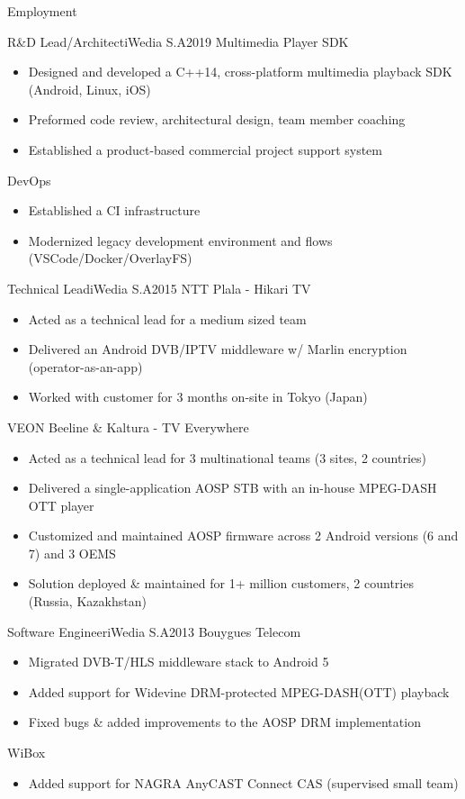 \documentclass[]{mcdowellcv}
\begin{document}
\begin{cvsection}{Employment}
		\begin{cvsubsection}{R\&D Lead/Architect}{iWedia S.A}{2019}
			Multimedia Player SDK
			\begin{itemize}
				\item Designed and developed a C++14, cross-platform multimedia playback SDK (Android, Linux, iOS)
				\item Preformed code review, architectural design, team member coaching
				\item Established a product-based commercial project support system
			\end{itemize}
			DevOps
			\begin{itemize}
				\item Established a CI infrastructure
				\item Modernized legacy development environment and flows (VSCode/Docker/OverlayFS)
			\end{itemize}
		\end{cvsubsection}

		\begin{cvsubsection}{Technical Lead}{iWedia S.A}{2015}
			NTT Plala - Hikari TV
			\begin{itemize}
				\item Acted as a technical lead for a medium sized team
				\item Delivered an Android DVB/IPTV middleware w/ Marlin encryption (operator-as-an-app)
				\item Worked with customer for 3 months on-site in Tokyo (Japan)
			\end{itemize}
			VEON Beeline \& Kaltura - TV Everywhere
			\begin{itemize}
				\item Acted as a technical lead for 3 multinational teams (3 sites, 2 countries)
				\item Delivered a single-application AOSP STB with an in-house MPEG-DASH OTT player
				\item Customized and maintained AOSP firmware across 2 Android versions (6 and 7) and 3 OEMS
				\item Solution deployed \& maintained for 1+ million customers, 2 countries (Russia, Kazakhstan)
			\end{itemize}
		\end{cvsubsection}

		\begin{cvsubsection}{Software Engineer}{iWedia S.A}{2013}
			Bouygues Telecom
			\begin{itemize}
				\item Migrated DVB-T/HLS middleware stack to Android 5
				\item Added support for Widevine DRM-protected MPEG-DASH(OTT) playback
				\item Fixed bugs \& added improvements to the AOSP DRM implementation
			\end{itemize}
			WiBox
			\begin{itemize}
				\item Added support for NAGRA AnyCAST Connect CAS (supervised small team)
			\end{itemize}
		\end{cvsubsection}


\end{cvsection}
\end{document}
